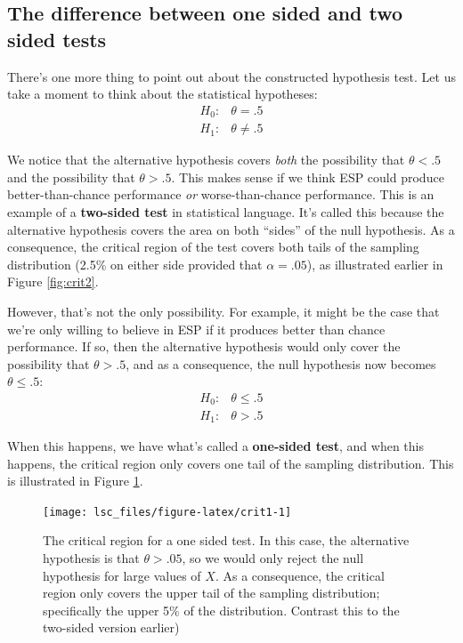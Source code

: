 \documentclass[
]{book}
\theoremstyle{definition}
\theoremstyle{definition}
\theoremstyle{definition}
\theoremstyle{definition}
\theoremstyle{remark}
\begin{document}
\hypertarget{onesidedtests}{%
\subsection{The difference between one sided and two sided tests}\label{onesidedtests}}

There's one more thing to point out about the constructed hypothesis test. Let us take a moment to think about the statistical hypotheses:
\[
\begin{array}{cc}
H_0 : & \theta = .5 \\
H_1 : & \theta \neq .5 
\end{array}
\]

We notice that the alternative hypothesis covers \emph{both} the possibility that \(\theta < .5\) and the possibility that \(\theta > .5\). This makes sense if we think ESP could produce better-than-chance performance \emph{or} worse-than-chance performance. This is an example of a \textbf{two-sided test} in statistical language. It's called this because the alternative hypothesis covers the area on both ``sides'' of the null hypothesis. As a consequence, the critical region of the test covers both tails of the sampling distribution (2.5\% on either side provided that \(\alpha =.05\)), as illustrated earlier in Figure \ref{fig:crit2}.

However, that's not the only possibility. For example, it might be the case that we're only willing to believe in ESP if it produces better than chance performance. If so, then the alternative hypothesis would only cover the possibility that \(\theta > .5\), and as a consequence, the null hypothesis now becomes \(\theta \leq .5\):
\[
\begin{array}{cc}
H_0 : & \theta \leq .5 \\
H_1 : & \theta > .5 
\end{array}
\]

When this happens, we have what's called a \textbf{one-sided test}, and when this happens, the critical region only covers one tail of the sampling distribution. This is illustrated in Figure \ref{fig:crit1}.



\begin{figure}

{\centering \texttt{[image: lsc\_files/figure-latex/crit1-1]} 

}

\caption{The critical region for a one sided test. In this case, the alternative hypothesis is that \(\theta > .05\), so we would only reject the null hypothesis for large values of \(X\). As a consequence, the critical region only covers the upper tail of the sampling distribution; specifically the upper 5\% of the distribution. Contrast this to the two-sided version earlier)}\label{fig:crit1}
\end{figure}
\end{document}
